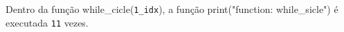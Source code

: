 \documentclass[12pt,varwidth=16cm,border=1pt]{standalone}
\begin{document}
Dentro da função while\_cicle(\verb+1_idx+), a função print("function: while\_sicle") é executada \verb+11+ vezes.

\questiomtrue
\end{document}
